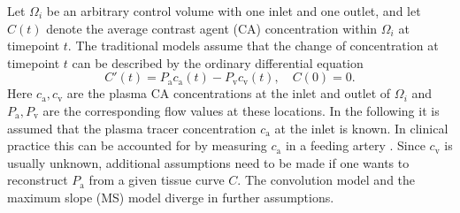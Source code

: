 \documentclass[journal,twocolumn]{IEEEtran}
\newcommand{\ca}{c_\mathrm{a}}
\newcommand{\cout}{c_{\mathrm{v}}}
\newcommand{\Pa}{P_{\mathrm{a}}}
\newcommand{\Pout}{P_{\mathrm{v}}}
\begin{document}
	Let $\Omega_i$ be an arbitrary control volume with one inlet and one outlet, and let $C(t)$ denote the average contrast agent (CA) concentration within $\Omega_i$ at timepoint $t$.
	The traditional models assume that the change of concentration at timepoint $t$ can be described by the ordinary differential equation 
	\begin{equation}\label{eq:classicgeneral}
		C'(t) = \Pa\ca(t) - \Pout\cout(t), \quad C(0) = 0.
	\end{equation}
	Here $\ca,\cout$ are the plasma CA concentrations at the inlet and outlet of $\Omega_i$ and $\Pa,\Pout$ are the corresponding flow values at these locations.
	In the following it is assumed that the plasma tracer concentration $\ca$ at the inlet is known.
	In clinical practice this can be accounted for by measuring $\ca$ in a feeding artery \cite{ostergaard96}.
	Since $\cout$ is usually unknown, additional assumptions need to be made if one wants to reconstruct $\Pa$ from a given tissue curve $C$. The convolution model and the maximum slope (MS) model diverge in further assumptions.
	
	

\end{document}
